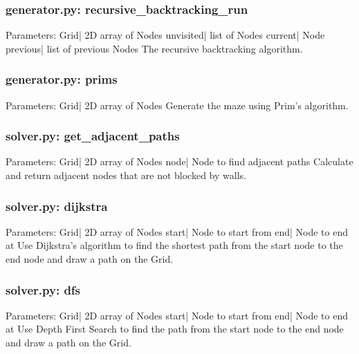 \documentclass{article}
\begin{document}
\subsubsection{generator.py: recursive\_backtracking\_run}
Parameters:\newline
\indent Grid| 2D array of Nodes\newline
\indent unvisited| list of Nodes\newline
\indent current| Node\newline
\indent previous| list of previous Nodes\newline
The recursive backtracking algorithm.

\subsubsection{generator.py: prims}
Parameters:\newline
\indent Grid| 2D array of Nodes\newline
Generate the maze using Prim's algorithm.

\subsubsection{solver.py: get\_adjacent\_paths}
Parameters:\newline
\indent Grid| 2D array of Nodes\newline
\indent node| Node to find adjacent paths\newline
Calculate and return adjacent nodes that are not blocked by walls.

\subsubsection{solver.py: dijkstra}
Parameters:\newline
\indent Grid| 2D array of Nodes\newline
\indent start| Node to start from\newline
\indent end| Node to end at\newline
Use Dijkstra's algorithm to find the shortest path from the start node to the end node and draw a path on the Grid.

\subsubsection{solver.py: dfs}
Parameters:\newline
\indent Grid| 2D array of Nodes\newline
\indent start| Node to start from\newline
\indent end| Node to end at\newline
Use Depth First Search to find the path from the start node to the end node and draw a path on the Grid.
\end{document}
